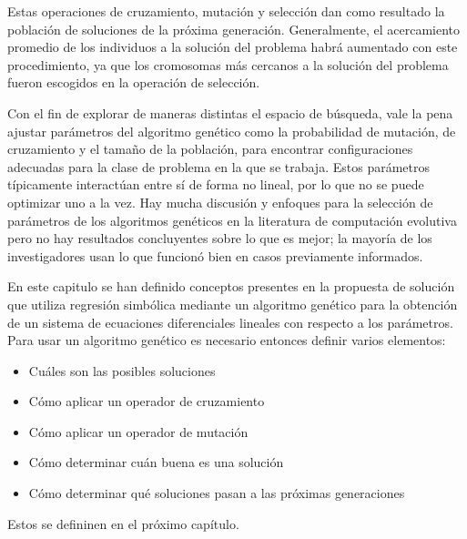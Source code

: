 Estas operaciones de cruzamiento, mutación y selección dan como resultado la población de soluciones de la próxima generación. Generalmente, el acercamiento promedio de los individuos a la solución del problema habrá aumentado con este procedimiento, ya que los cromosomas más cercanos a la solución del problema fueron escogidos en la operación de selección.

Con el fin de explorar de maneras distintas el espacio de búsqueda, vale la pena ajustar parámetros del algoritmo genético como la probabilidad de mutación, de cruzamiento y el tamaño de la población, para encontrar configuraciones adecuadas para la clase de problema en la que se trabaja. Estos parámetros típicamente interactúan entre sí de forma no lineal, por lo que no se puede optimizar uno a la vez. Hay mucha discusión y enfoques para la selección de parámetros de los algoritmos genéticos en la literatura de computación evolutiva pero no hay resultados concluyentes sobre lo que es mejor; la mayoría de los investigadores usan lo que funcionó bien en casos previamente informados. \cite{mitchell1998introduction}

En este capitulo se han definido conceptos presentes en la propuesta de solución que utiliza regresión simbólica mediante un algoritmo genético para la obtención de un sistema de ecuaciones diferenciales lineales con respecto a los parámetros. Para usar un algoritmo genético es necesario entonces definir varios elementos:

\begin{itemize}
    \item Cuáles son las posibles soluciones
    \item Cómo aplicar un operador de cruzamiento
    \item Cómo aplicar un operador de mutación
    \item Cómo determinar cuán buena es una solución
    \item Cómo determinar qué soluciones pasan a las próximas generaciones
\end{itemize}

Estos se defininen en el próximo capítulo.
